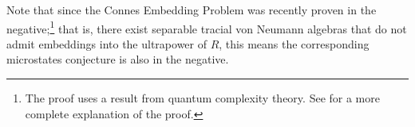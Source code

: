 \documentclass[10pt]{mypackage}
\begin{document}
Note that since the Connes Embedding Problem was recently proven in the negative;\footnote{The proof uses a result from quantum complexity theory. See \cite{goldbring2021connesembeddingproblemguided} for a more complete explanation of the proof.} that is, there exist separable tracial von Neumann algebras that do not admit embeddings into the ultrapower of $R$, this means the corresponding microstates conjecture is also in the negative.
\printbibliography
\end{document}
